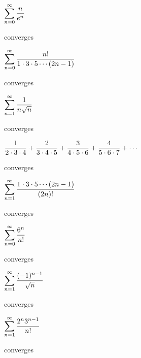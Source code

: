 \begin{exercises}
\begin{exercise} $\displaystyle\sum_{n=0}^\infty {n\over e^n}$
\begin{answer} converges
\end{answer}\end{exercise}

\begin{exercise} $\displaystyle\sum_{n=0}^\infty {n!\over 1\cdot3\cdot5\cdots(2n-1)}$
\begin{answer} converges
\end{answer}\end{exercise}

\begin{exercise} $\displaystyle\sum_{n=1}^\infty {1\over n\sqrt n}$
\begin{answer} converges
\end{answer}\end{exercise}

\begin{exercise} $\displaystyle{1\over 2\cdot 3\cdot 4}+{2\over 3\cdot
  4\cdot 5}+{3\over 4\cdot 5\cdot 6}+{4\over 5\cdot 6 \cdot 7}+\cdots$
\begin{answer} converges
\end{answer}\end{exercise}

\begin{exercise} $\displaystyle\sum_{n=1}^\infty {1\cdot3\cdot5\cdots(2n-1)\over (2n)!}$
\begin{answer} converges
\end{answer}\end{exercise}

\begin{exercise} $\displaystyle\sum_{n=0}^\infty {6^n\over n!}$
\begin{answer} converges
\end{answer}\end{exercise}

\begin{exercise} $\displaystyle\sum_{n=1}^\infty {(-1)^{n-1}\over\sqrt n}$
\begin{answer} converges
\end{answer}\end{exercise}

\begin{exercise} $\displaystyle\sum_{n=1}^\infty {2^n 3^{n-1}\over n!}$
\begin{answer} converges
\end{answer}\end{exercise}


\end{exercises}
